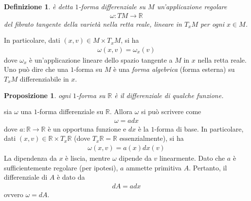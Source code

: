\documentclass[oneside, 11pt]{amsbook}
\makeatletter
\newcommand{\0}{{(0)}}
\newcommand{\3}{{(3)}}
\theoremstyle{colonplain}
\newtheorem{prop}[thm]{Proposizione}
\theoremstyle{colondefinition}
\newtheorem{defn}[thm]{Definizione}
\theoremstyle{colonremark}
\numberwithin{equation}{chapter}
\renewcommand{\proofname}{Dimostrazione}
\renewenvironment{proof}[1][\proofname]{\par
  \pushQED{\qed}%
  \normalfont \topsep6\p@\@plus6\p@\relax
  \trivlist
  \item[\hskip\labelsep\bfseries #1:]\ignorespaces
}{%
  \popQED\endtrivlist\@endpefalse
}
\makeatother
\begin{document}
\begin{defn} è detta $1$-\textit{forma differenziale} su $M$ un'applicazione regolare
\begin{align}
    \omega : TM \longrightarrow \mathbb{R} 
\end{align}
del fibrato tangente della varietà nella retta reale, lineare in $T_xM$ per ogni $x \in M$.
\end{defn}
In particolare, dati $(x, v) \in M \times T_xM$, si ha 
\begin{align}
    \omega(x, v) = \omega_x(v) 
\end{align}
dove $\omega_x$ è un'applicazione lineare dello spazio tangente a $M$ in $x$ nella retta reale. \\
Uno può dire che una $1$-forma su $M$ è una \textit{forma algebrica} (forma esterna) su $T_xM$ differenziabile in $x$.
\begin{prop} ogni $1$-forma su $\mathbb{R}$ è il differenziale di qualche funzione.
\end{prop}
\begin{proof} sia $\omega$ una $1$-forma differenziale su $\mathbb{R}$. Allora $\omega$ si può scrivere come 
\begin{align}
    \omega = adx 
\end{align}
dove $a : \mathbb{R} \longrightarrow \mathbb{R}$ è un opportuna funzione e $dx$ è la $1$-forma di base. In particolare, dati $(x, v) \in \mathbb{R} \times T_x\mathbb{R}$ (dove $T_x\mathbb{R} = \mathbb{R}$ essenzialmente), si ha 
\begin{align}
    \omega(x, v) = a(x)dx(v)
\end{align}
La dipendenza da $x$ è liscia, mentre $\omega$ dipende da $v$ linearmente. Dato che $a$ è sufficientemente regolare (per ipotesi), $a$ ammette primitiva $A$. Pertanto, il differenziale di $A$ è dato da
\begin{align}
    dA = adx
\end{align}
ovvero $\omega = dA$.
\end{proof}
\end{document}
